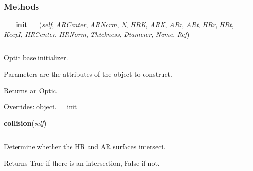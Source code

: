 
  \subsubsection{Methods}

    \vspace{0.5ex}

\hspace{.8\funcindent}\begin{boxedminipage}{\funcwidth}

    \raggedright \textbf{\_\_init\_\_}(\textit{self}, \textit{ARCenter}, \textit{ARNorm}, \textit{N}, \textit{HRK}, \textit{ARK}, \textit{ARr}, \textit{ARt}, \textit{HRr}, \textit{HRt}, \textit{KeepI}, \textit{HRCenter}, \textit{HRNorm}, \textit{Thickness}, \textit{Diameter}, \textit{Name}, \textit{Ref})

    \vspace{-1.5ex}

    \rule{\textwidth}{0.5\fboxrule}
\setlength{\parskip}{2ex}
    Optic base initializer.

    Parameters are the attributes of the object to construct.

    Returns an Optic.

\setlength{\parskip}{1ex}
      Overrides: object.\_\_init\_\_

    \end{boxedminipage}

    \label{theia:optics:optic:Optic:collision}

    \vspace{0.5ex}

\hspace{.8\funcindent}\begin{boxedminipage}{\funcwidth}

    \raggedright \textbf{collision}(\textit{self})

    \vspace{-1.5ex}

    \rule{\textwidth}{0.5\fboxrule}
\setlength{\parskip}{2ex}
    Determine whether the HR and AR surfaces intersect.

    Returns True if there is an intersection, False if not.

\setlength{\parskip}{1ex}
    \end{boxedminipage}

